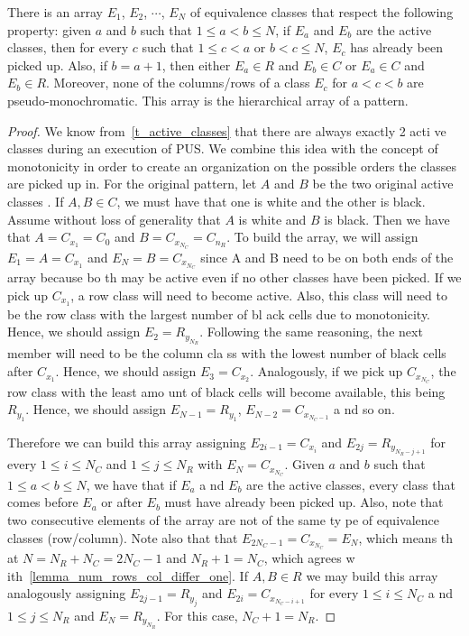 \begin{proposition}
\label{corollary_hierarchical_sequence}
There is an array $E_{1}$, $E_{2}$, $\cdots$, $E_{N}$ of equivalence classes that respect the following property: given $a$ and $b$ such that $1 \leq a < b \leq N$, if $E_{a}$ and $E_{b}$ are the active classes, then for every $c$ such that $1 \leq c < a$ or $b < c \leq N$, $E_{c}$ has already been picked up. Also, if $b = a + 1$, then either $E_{a} \in R$ and $E_{b} \in C$ or $E_{a} \in C$ and $E_{b} \in R$. 
Moreover, none of the columns/rows of a class $E_c$ for $a < c < b$ are
pseudo-monochromatic.  This array is the hierarchical array of a pattern.
\end{proposition}


\begin{proof}
We know from~\autoref{t_active_classes} that there are always exactly 2 acti
ve classes during an execution of PUS.
We combine this idea with the concept of monotonicity in order to create an 
organization on the possible orders the classes are picked up in.
For the original pattern, let $A$ and $B$ be the two original active classes
.
If $A,B \in C$, we must have that one is white and the other is black.
Assume without loss of generality that $A$ is white and $B$ is black.
Then we have that $A = C_{x_{1}} = C_{0}$ and $B = C_{x_{N_{C}}} = C_{n_{R}}
$.
To build the array, we will assign $E_{1} = A = C_{x_{1}}$ and $E_{N} = B = 
C_{x_{N_{C}}}$ since A and B need to be on both ends of the array because bo
th may be active even if no other classes have been picked.
If we pick up $C_{x_{1}}$, a row class will need to become active.
Also, this class will need to be the row class with the largest number of bl
ack cells due to monotonicity.
Hence, we should assign $E_{2} = R_{y_{N_{R}}}$.
Following the same reasoning, the next member will need to be the column cla
ss with the lowest number of black cells after $C_{x_{1}}$.
Hence, we should assign $E_{3} = C_{x_{2}}$.
Analogously, if we pick up $C_{x_{N_{C}}}$, the row class with the least amo
unt of black cells will become available, this being $R_{y_{1}}$.
Hence, we should assign $E_{N-1} = R_{y_{1}}$, $E_{N-2} = C_{x_{N_{C}-1}}$ a
nd so on.

Therefore we can build this array assigning $E_{2i - 1} = C_{x_{i}}$ and $E_
{2j} = R_{y_{N_{R}-j+1}}$ for every $1 \leq i \leq N_{C}$ and $1 \leq j \leq
 N_{R}$ with $E_{N} = C_{x_{N_{C}}}$.
Given $a$ and $b$ such that $1 \leq a < b \leq N$, we have that if $E_{a}$ a
nd $E_{b}$ are the active classes, every class that comes before $E_{a}$ or 
after $E_{b}$ must have already been picked up.
Also, note that two consecutive elements of the array are not of the same ty
pe of equivalence classes (row/column).
Note also that that $E_{2N_{C} - 1} = C_{x_{N_{C}}} = E_{N}$, which means th
at $N = N_{R} + N_{C} = 2N_{C} - 1$ and $N_{R} + 1 =  N_{C}$, which agrees w
ith~\autoref{lemma_num_rows_col_differ_one}.
If $A,B \in R$ we may build this array analogously assigning $E_{2j - 1} = R
_{y_{j}}$ and $E_{2i} = C_{x_{N_{C}-i+1}}$ for every $1 \leq i \leq N_{C}$ a
nd $1 \leq j \leq N_{R}$ and $E_{N} = R_{y_{N_{R}}}$. For this case, $N_{C} 
+ 1 =  N_{R}$.


\end{proof}
